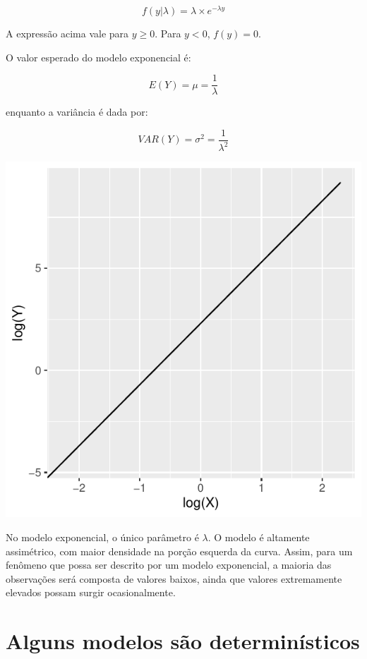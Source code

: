 \documentclass[
]{book}
\begin{document}
\[f(y|\lambda) = \lambda \times e^{-\lambda y}\]

A expressão acima vale para \(y \ge 0\). Para \(y < 0\), \(f(y) = 0\).

O valor esperado do modelo exponencial é:

\[E(Y) = \mu = \frac{1}{\lambda}\]

enquanto a variância é dada por:

\[VAR(Y) = \sigma^2 = \frac{1}{\lambda^2}\]

\begin{center}\includegraphics{probest-cambientais_files/figure-latex/unnamed-chunk-215-1} \end{center}

No modelo exponencial, o único parâmetro é \(\lambda\). O modelo é altamente assimétrico, com maior densidade na porção esquerda da curva. Assim, para um fenômeno que possa ser descrito por um modelo exponencial, a maioria das observações será composta de valores baixos, ainda que valores extremamente elevados possam surgir ocasionalmente.

\hypertarget{detmodel}{%
\chapter{Alguns modelos são determinísticos}\label{detmodel}}
\end{document}
